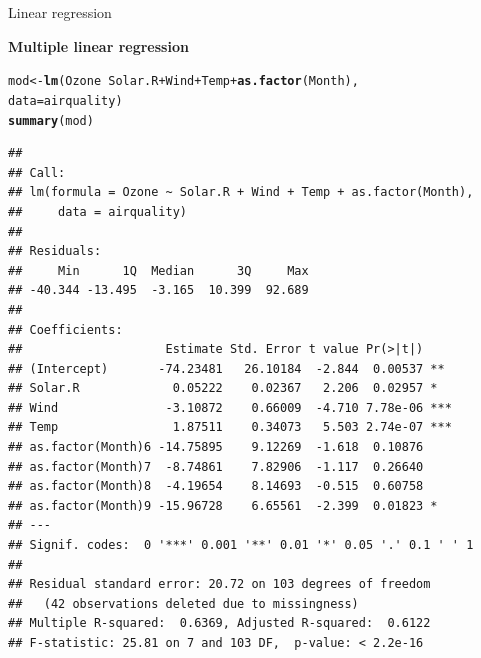 \documentclass[10pt,xcolor=dvipsnames]{beamer}\usepackage[]{graphicx}\usepackage[]{color}
\makeatletter
\newcommand{\hlopt}[1]{\textcolor[rgb]{0,0,0}{#1}}%
\newcommand{\hlstd}[1]{\textcolor[rgb]{0.345,0.345,0.345}{#1}}%
\newcommand{\hlkwb}[1]{\textcolor[rgb]{0.69,0.353,0.396}{#1}}%
\newcommand{\hlkwc}[1]{\textcolor[rgb]{0.333,0.667,0.333}{#1}}%
\newcommand{\hlkwd}[1]{\textcolor[rgb]{0.737,0.353,0.396}{\textbf{#1}}}%
\newenvironment{kframe}{%
 \def\at@end@of@kframe{}%
 \ifinner\ifhmode%
  \def\at@end@of@kframe{\end{minipage}}%
  \begin{minipage}{\columnwidth}%
 \fi\fi%
 \def\FrameCommand##1{\hskip\@totalleftmargin \hskip-\fboxsep
 \colorbox{shadecolor}{##1}\hskip-\fboxsep
     \hskip-\linewidth \hskip-\@totalleftmargin \hskip\columnwidth}%
 \MakeFramed {\advance\hsize-\width
   \@totalleftmargin\z@ \linewidth\hsize
   \@setminipage}}%
 {\par\unskip\endMakeFramed%
 \at@end@of@kframe}
\newenvironment{knitrout}{}{} %
\makeatother
\begin{document}
\begin{frame}[fragile]{Linear regression}

\textbf{Multiple linear regression}
\begin{knitrout}
\color{fgcolor}\begin{kframe}
\begin{alltt}
\hlstd{mod} \hlkwb{<-} \hlkwd{lm}\hlstd{(Ozone} \hlopt{~} \hlstd{Solar.R} \hlopt{+} \hlstd{Wind} \hlopt{+} \hlstd{Temp} \hlopt{+} \hlkwd{as.factor}\hlstd{(Month),}
          \hlkwc{data}\hlstd{=airquality)}
\hlkwd{summary}\hlstd{(mod)}
\end{alltt}
\begin{verbatim}
## 
## Call:
## lm(formula = Ozone ~ Solar.R + Wind + Temp + as.factor(Month), 
##     data = airquality)
## 
## Residuals:
##     Min      1Q  Median      3Q     Max 
## -40.344 -13.495  -3.165  10.399  92.689 
## 
## Coefficients:
##                    Estimate Std. Error t value Pr(>|t|)    
## (Intercept)       -74.23481   26.10184  -2.844  0.00537 ** 
## Solar.R             0.05222    0.02367   2.206  0.02957 *  
## Wind               -3.10872    0.66009  -4.710 7.78e-06 ***
## Temp                1.87511    0.34073   5.503 2.74e-07 ***
## as.factor(Month)6 -14.75895    9.12269  -1.618  0.10876    
## as.factor(Month)7  -8.74861    7.82906  -1.117  0.26640    
## as.factor(Month)8  -4.19654    8.14693  -0.515  0.60758    
## as.factor(Month)9 -15.96728    6.65561  -2.399  0.01823 *  
## ---
## Signif. codes:  0 '***' 0.001 '**' 0.01 '*' 0.05 '.' 0.1 ' ' 1
## 
## Residual standard error: 20.72 on 103 degrees of freedom
##   (42 observations deleted due to missingness)
## Multiple R-squared:  0.6369,	Adjusted R-squared:  0.6122 
## F-statistic: 25.81 on 7 and 103 DF,  p-value: < 2.2e-16
\end{verbatim}
\end{kframe}
\end{knitrout}
\end{frame}
\end{document}
